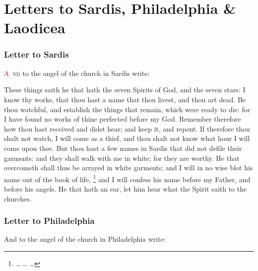 \chapter{Letters to Sardis, Philadelphia \& Laodicea}
\subsection*{Letter to Sardis}
\lettrine[lines=3]{\textcolor{red}{A}}{\ nd} to the angel of the church in Sardis write:

\zz These things saith he that hath the seven Spirits of God, and the seven stars: I know thy works, that thou hast a name that thou livest, and thou art dead. %
 Be thou watchful, and establish the things that remain, which were ready to die: for I have found no works of thine perfected before my God. %
 Remember therefore how thou hast received and didst hear; and keep it, and repent. If therefore thou shalt not watch, I will come as a thief, and thou shalt not know what hour I will come upon thee. %
 But thou hast a few names in Sardis that did not defile their garments: and they shall walk with me in white; for they are worthy. %
 He that overcometh shall thus be arrayed in white garments; and I will in no wise blot his name out of the book of life,%
	\footnote{\ldots%
			\ldots%
			\ldots%
			}
 and I will confess his name before my Father, and before his angels. %
 He that hath an ear, let him hear what the Spirit saith to the churches.
\subsection*{Letter to Philadelphia}
 And to the angel of the church in Philadelphia write:

